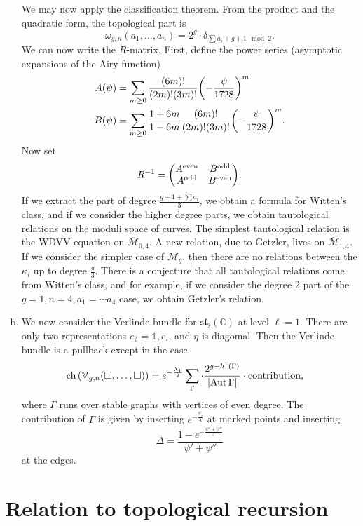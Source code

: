 \documentclass[leqno, openany]{memoir}
\theoremstyle{definition}
\theoremstyle{remark}
\theoremstyle{plain}
\theoremstyle{definition}
\theoremstyle{remark}
\newcommand{\C}{\mathbb{C}}
\newcommand{\mc}[1]{\mathcal{#1}}
\newcommand{\mf}[1]{\mathfrak{#1}}
\newcommand{\mr}[1]{\mathrm{#1}}
\newcommand{\on}[1]{\operatorname{#1}}
\newcommand{\ol}[1]{\overline{#1}}
\DeclareMathOperator{\Aut}{Aut}
\begin{document}
\begin{enumerate}[(a)]
  We may now apply the classification theorem. From the product and the quadratic form, the topological part is
  \[ \omega_{g,n}(a_1, \ldots, a_n) = 2^g \cdot \delta_{\sum a_i + g+1 \mod 2}. \]
  We can now write the $R$-matrix. First, define the power series (asymptotic expansions of the Airy function)
  \begin{align*}
    A(\psi) &= \sum_{m\geq 0} \frac{(6m)!}{(2m)!(3m)!} \qty(-\frac{\psi}{1728})^m \\
    B(\psi) &= \sum_{m\geq 0} \frac{1+6m}{1-6m} \frac{(6m)!}{(2m)!(3m)!} \qty(-\frac{\psi}{1728})^m.
  \end{align*}
  Now set
  \[ R^{-1} = \mqty(A^{\mr{even}} & B^{\mr{odd}} \\ A^{\mr{odd}} & B^{\mr{even}}). \]
  If we extract the part of degree $\frac{g-1+\sum a_i}{3}$, we obtain a formula for Witten's class, and if we consider the higher degree parts, we obtain tautological relations on the moduli space of curves. The simplest tautological relation is the WDVV equation on $\ol{\mc{M}}_{0,4}$. A new relation, due to Getzler, lives on $\ol{\mc{M}}_{1,4}$. If we consider the simpler case of $\mc{M}_g$, then there are no relations between the $\kappa_i$ up to degree $\frac{g}{3}$. There is a conjecture that all tautological relations come from Witten's class, and for example, if we consider the degree $2$ part of the $g=1,n=4,a_1 = \cdots a_4$ case, we obtain Getzler's relation.
\item We now consider the Verlinde bundle for $\mf{sl}_2(\C)$ at level $\ell = 1$. There are only two representations $e_{\emptyset} = \mathbb{1}, e_{\square}$, and $\eta$ is diagomal. Then the Verlinde bundle is a pullback except in the case
  \begin{align*}
\on{ch}\qty(\mathbb{V}_{g,n}(\square, \ldots, \square)) &= e^{-\frac{\lambda_1}{2}} \sum_{\Gamma} \cdot \frac{2^{g-h^1(\Gamma)}}{\abs{\Aut \Gamma}} \cdot \text{contribution},
  \end{align*}
  where $\Gamma$ runs over stable graphs with vertices of even degree. The contribution of $\Gamma$ is given by inserting $e^{-\frac{\psi_i}{4}}$ at marked points and inserting
  \[ \Delta = \frac{1-e^{-\frac{\psi'+\psi''}{4}}}{\psi' + \psi''} \]
  at the edges.
\end{enumerate}

\section{Relation to topological recursion}
\label{sec:relation_tr}
\end{document}
